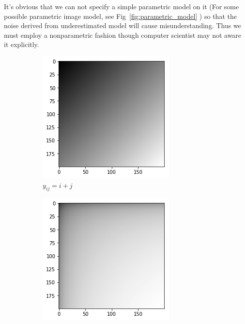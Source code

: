 \documentclass{beamer}
\begin{document}
\begin{frame}
    It's obvious that we can not specify a simple parametric model on it (For some possible parametric image model,
    see Fig~\ref{fig:parametric_model} ) so that the noise derived from underestimated model will cause misunderstanding. 
    Thus we must employ a nonparametric fashion though computer scientist may not aware it explicitly.
    
    \begin{figure}[htb]
      \centering
      \begin{subfigure}[b]{0.24\linewidth}
        \includegraphics[width=\linewidth]{images/parametric_model_1.png}
        \caption{$y_{ij} = i+j$}
      \end{subfigure}
      \begin{subfigure}[b]{0.24\linewidth}
        \includegraphics[width=\linewidth]{images/parametric_model_2.png}

\end{subfigure}
\end{figure}
\end{frame}
\end{document}
